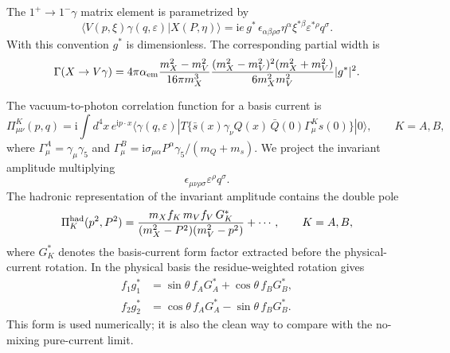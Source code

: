 \documentclass[aps,prd,a4paper,preprint,preprintnumbers,titlepage,
nofootinbib,superscriptaddress]{revtex4-2}
\newcommand{\ii}{\mathrm{i}}
\newcommand{\gstar}{g^\ast}
\begin{document}
The \(1^+\to1^-\gamma\) matrix element is parametrized by
\begin{equation}
  \langle V(p,\xi)\gamma(q,\varepsilon)|X(P,\eta)\rangle
  =
  \ii e\,\gstar\,
  \epsilon_{\alpha\beta\rho\sigma}
  \eta^\alpha \xi^{\ast\beta}\varepsilon^{\ast\rho}q^\sigma .
  \label{eq:matrix-element}
\end{equation}
With this convention \(\gstar\) is dimensionless.  The corresponding partial
width is
\begin{equation}
  \Gamma(X\to V\gamma)
  =
  4\pi\alpha_{\rm em}
  \frac{m_X^2-m_V^2}{16\pi m_X^3}
  \frac{(m_X^2-m_V^2)^2(m_X^2+m_V^2)}{6m_X^2m_V^2}
  |\gstar|^2 .
  \label{eq:width}
\end{equation}

The vacuum-to-photon correlation function for a basis current is
\begin{equation}
  \Pi_{\mu\nu}^K(p,q)=\ii\int d^4x\,e^{\ii p\cdot x}
  \langle\gamma(q,\varepsilon)|
  T\{\bar s(x)\gamma_\nu Q(x)\,\bar Q(0)\Gamma_\mu^K s(0)\}
  |0\rangle ,
  \qquad K=A,B ,
  \label{eq:correlator}
\end{equation}
where \(\Gamma_\mu^A=\gamma_\mu\gamma_5\) and
\(\Gamma_\mu^B=\ii\sigma_{\mu\alpha}P^\alpha\gamma_5/(m_Q+m_s)\).  We
project the invariant amplitude multiplying
\begin{equation}
  \epsilon_{\mu\nu\rho\sigma}\varepsilon^\rho q^\sigma .
  \label{eq:epsilon-structure}
\end{equation}
The hadronic representation of the invariant amplitude contains the double
pole
\begin{equation}
  \Pi_K^{\rm had}(p^2,P^2)=
  \frac{m_X f_K\,m_V f_V\,G_K^\ast}
  {(m_X^2-P^2)(m_V^2-p^2)}
  +\cdots ,
  \qquad K=A,B ,
  \label{eq:hadronic-basis}
\end{equation}
where \(G_K^\ast\) denotes the basis-current form factor extracted before
the physical-current rotation.  In the physical basis the residue-weighted
rotation gives
\begin{align}
  f_1 g_1^\ast &=
  \sin\theta\,f_A G_A^\ast+\cos\theta\,f_B G_B^\ast,
  \label{eq:rotation-low}\\
  f_2 g_2^\ast &=
  \cos\theta\,f_A G_A^\ast-\sin\theta\,f_B G_B^\ast .
  \label{eq:rotation-high}
\end{align}
This form is used numerically; it is also the clean way to compare with the
no-mixing pure-current limit.
\end{document}
